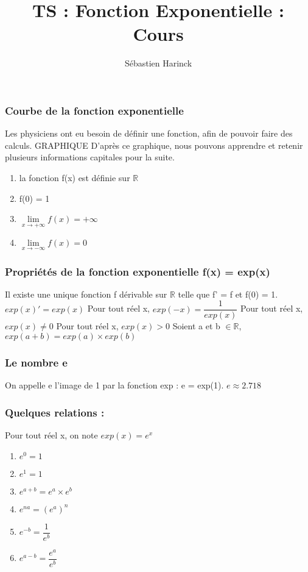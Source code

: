 \documentclass[t]{beamer}
\title{TS : Fonction Exponentielle : Cours}
\author{Sébastien Harinck}
\institute{www.cours-futes.com}
\date{}
\begin{document}
\begin{frame}
\titlepage
\end{frame}

\begin{frame}[label=pagebanale]
\frametitle{Courbe de la fonction exponentielle}
\pause
Les physiciens ont eu besoin de définir une fonction, afin de pouvoir faire des calculs.
\pause
GRAPHIQUE
\pause
D'après ce graphique, nous pouvons apprendre et retenir plusieurs informations capitales pour la suite.
\begin{enumerate}
\item<+-> la fonction f(x) est définie sur $\mathbb{R} $
\item<+-> f(0) = 1 
\item<+-> \( \lim\limits_{x \rightarrow +\infty} f(x) = +\infty \)
\item<+-> \( \lim\limits_{x \rightarrow -\infty} f(x) = 0 \)
\end{enumerate}
\end{frame}

\begin{frame}
\frametitle{Propriétés de la fonction exponentielle f(x) = exp(x)}
\pause
Il existe une unique fonction f dérivable sur $\mathbb{R}$ telle que f' = f et f(0) = 1.
\pause
\( exp(x)' = exp(x)\)
\pause
Pour tout réel x, $ exp(-x) = \dfrac{1}{exp(x)}$
\pause
Pour tout réel x, $ exp(x) \neq 0 $
\pause
Pour tout réel x, $ exp(x) > 0 $
\pause
Soient a et b $\in \mathbb{R}$,$ exp(a+b) = exp(a) \times exp(b)$
\end{frame}

\begin{frame}
\frametitle{Le nombre e}
On appelle e l'image de 1 par la fonction exp : e = exp(1).
\pause
\( e \approx 2.718\)
\end{frame}

\begin{frame}
\frametitle{Quelques relations :}
\pause
Pour tout réel x, on note $exp(x) = e^x$
\pause
\begin{enumerate}
\item<+-> \( e^0 = 1\)
\item<+-> \( e^1 = 1\) 
\item<+-> \( e^{a+b} = e^a \times e^b\) 
\item<+-> \( e^{na} = (e^a)^n\)
\item<+-> \( e^{-b} = \dfrac{1}{e^b}\)  
\item<+-> \( e^{a-b} = \dfrac{e^a}{e^b}\)  
\end{enumerate}
\end{frame}
\end{document}
